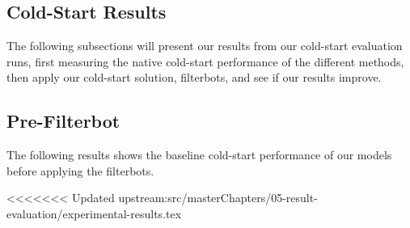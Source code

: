 








\subsection{Cold-Start Results}

The following subsections will present our results from our cold-start evaluation runs, first measuring the native cold-start performance
of the different methods, then apply our cold-start solution, filterbots, and see if our results improve.

\subsection{Pre-Filterbot}

The following results shows the baseline cold-start performance of our models before applying the filterbots.


<<<<<<< Updated upstream:src/masterChapters/05-result-evaluation/experimental-results.tex

